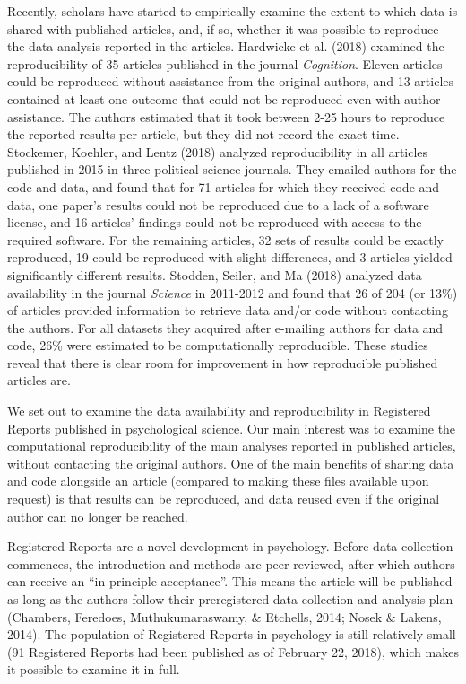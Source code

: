 \documentclass[,jou, a4paper,floatsintext]{apa6}
\begin{document}
Recently, scholars have started to empirically examine the extent to which data is shared with published articles, and, if so, whether it was possible to reproduce the data analysis reported in the articles. Hardwicke et al. (2018) examined the reproducibility of 35 articles published in the journal \emph{Cognition}. Eleven articles could be reproduced without assistance from the original authors, and 13 articles contained at least one outcome that could not be reproduced even with author assistance. The authors estimated that it took between 2-25 hours to reproduce the reported results per article, but they did not record the exact time. Stockemer, Koehler, and Lentz (2018) analyzed reproducibility in all articles published in 2015 in three political science journals. They emailed authors for the code and data, and found that for 71 articles for which they received code and data, one paper's results could not be reproduced due to a lack of a software license, and 16 articles' findings could not be reproduced with access to the required software. For the remaining articles, 32 sets of results could be exactly reproduced, 19 could be reproduced with slight differences, and 3 articles yielded significantly different results. Stodden, Seiler, and Ma (2018) analyzed data availability in the journal \emph{Science} in 2011-2012 and found that 26 of 204 (or 13\%) of articles provided information to retrieve data and/or code without contacting the authors. For all datasets they acquired after e-mailing authors for data and code, 26\% were estimated to be computationally reproducible. These studies reveal that there is clear room for improvement in how reproducible published articles are.

We set out to examine the data availability and reproducibility in Registered Reports published in psychological science. Our main interest was to examine the computational reproducibility of the main analyses reported in published articles, without contacting the original authors. One of the main benefits of sharing data and code alongside an article (compared to making these files available upon request) is that results can be reproduced, and data reused even if the original author can no longer be reached.

Registered Reports are a novel development in psychology. Before data collection commences, the introduction and methods are peer-reviewed, after which authors can receive an \enquote{in-principle acceptance}. This means the article will be published as long as the authors follow their preregistered data collection and analysis plan (Chambers, Feredoes, Muthukumaraswamy, \& Etchells, 2014; Nosek \& Lakens, 2014). The population of Registered Reports in psychology is still relatively small (91 Registered Reports had been published as of February 22, 2018), which makes it possible to examine it in full.
\end{document}
